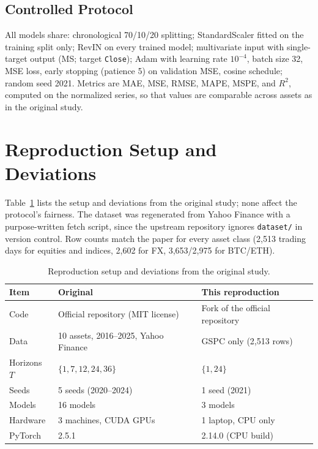\documentclass[conference]{IEEEtran}
\begin{document}
\subsection{Controlled Protocol}

All models share: chronological 70/10/20 splitting; StandardScaler fitted
on the training split only; RevIN on every trained model; multivariate
input with single-target output (MS; target \texttt{Close}); Adam with
learning rate $10^{-4}$, batch size 32, MSE loss, early stopping (patience
5) on validation MSE, cosine schedule; random seed 2021. Metrics are MAE,
MSE, RMSE, MAPE, MSPE, and $R^2$, computed on the normalized series, so
that values are comparable across assets as in the original study.

\section{Reproduction Setup and Deviations}
\label{sec:setup}

Table~\ref{tab:setup} lists the setup and deviations from the original
study; none affect the protocol's fairness. The dataset was regenerated
from Yahoo Finance with a purpose-written fetch script, since the upstream
repository ignores \texttt{dataset/} in version control. Row counts match
the paper for every asset class (2{,}513 trading days for equities and
indices, 2{,}602 for FX, 3{,}653/2{,}975 for BTC/ETH).

\begin{table}[!t]
\centering
\caption{Reproduction setup and deviations from the original study.}
\label{tab:setup}
\small
\begin{tabular}{@{}p{1.35cm}p{2.4cm}p{3.3cm}@{}}
\toprule
Item & Original & This reproduction \\
\midrule
Code & Official repository (MIT license) & Fork of the official repository \\
Data & 10 assets, 2016--2025, Yahoo Finance & GSPC only (2{,}513 rows) \\
Horizons $T$ & $\{1,7,12,24,36\}$ & $\{1,24\}$ \\
Seeds & 5 seeds (2020--2024) & 1 seed (2021) \\
Models & 16 models & 3 models \\
Hardware & 3 machines, CUDA GPUs & 1 laptop, CPU only \\
PyTorch & 2.5.1 & 2.14.0 (CPU build) \\
\bottomrule
\end{tabular}
\end{table}
\end{document}
